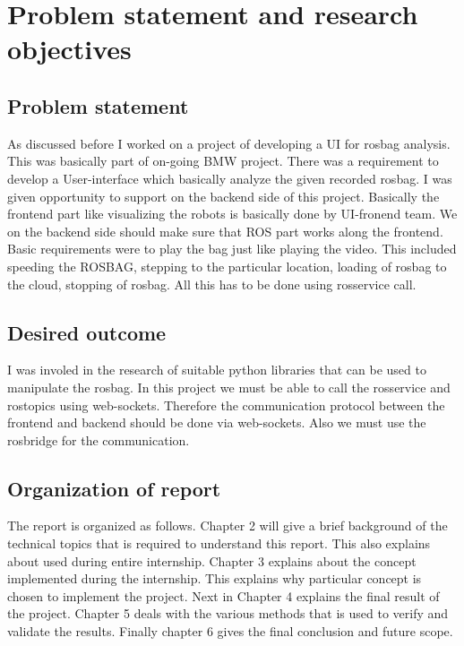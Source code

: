 \pagebreak
\section{Problem statement and research objectives}
\subsection{Problem statement}
As discussed before I worked on a project of developing a UI for rosbag analysis. This was basically part of on-going BMW project. There was a requirement to develop a User-interface which basically analyze the given recorded rosbag. I was given opportunity to support on the backend side of this project. Basically the frontend part like visualizing the robots is basically done by UI-fronend team. We on the backend side should make sure that ROS part works along the frontend. Basic requirements were to play the bag just like playing the video. This included speeding the ROSBAG, stepping to the particular location, loading of rosbag to the cloud, stopping of rosbag. All this has to be done using rosservice call. 

\subsection{Desired outcome}
I was involed in the research of suitable python libraries that can be used to manipulate the rosbag. In this project we must be able to call the rosservice and rostopics using web-sockets. Therefore the communication protocol between the frontend and backend should be done via web-sockets. Also we must use the rosbridge for the communication. 
\subsection{Organization of report}
The report is organized as follows. Chapter 2 will give a brief background of the technical topics that is required to understand this report. This also explains about used during entire internship. Chapter 3 explains about the concept implemented during the internship. This explains why particular concept is chosen to implement the project. Next in Chapter 4 explains the final result of the project. Chapter 5 deals with the various methods that is used to verify and validate the results. Finally chapter 6 gives the final conclusion and future scope.
